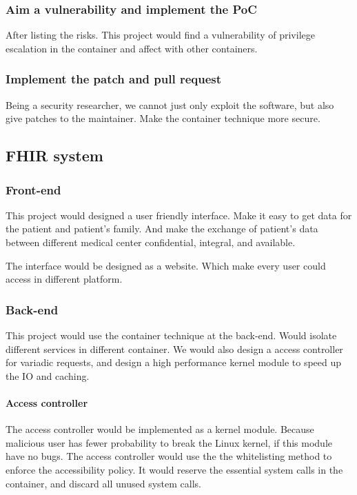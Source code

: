 \documentclass[12pt,a4paper]{IEEEconf}
\begin{document}
\subsubsection{Aim a vulnerability and implement the PoC}
After listing the risks. This project would find a vulnerability of privilege escalation in
the container and affect with other containers.

\subsubsection{Implement the patch and pull request}
Being a security researcher, we cannot just only exploit the software, but also give patches to
the maintainer. Make the container technique more secure.

\subsection{FHIR system}
\subsubsection{Front-end}
This project would designed a user friendly interface. Make it easy to get data for the
patient and patient's family. And make the exchange of patient's data between different medical
center confidential, integral, and available.

The interface would be designed as a website. Which make every user could access in different platform.

\subsubsection{Back-end}
This project would use the container technique at the back-end. Would isolate different services in
different container. We would also design a access controller for variadic requests, and
design a high performance kernel module to speed up the IO and caching.

\paragraph{Access controller}
The access controller would be implemented as a kernel module. Because malicious user has fewer
probability to break the Linux kernel, if this module have no bugs.
The access controller would use the the whitelisting method to enforce the accessibility policy.
It would reserve the essential system calls in the container, and discard all unused system calls.
\end{document}
